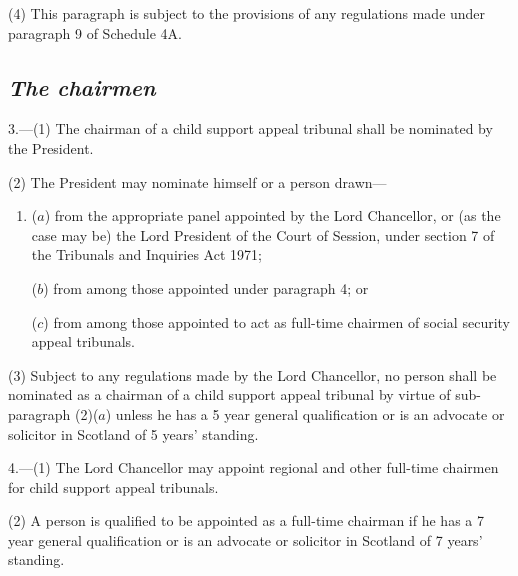 \documentclass[12pt,a4paper]{article}
\begin{document}
(4) This paragraph is subject to the provisions of any regulations made under paragraph 9 of Schedule 4A.


\subsection*{\itshape The chairmen}

3.---(1) The chairman of a child support appeal tribunal shall be nominated by the President.

(2) The President may nominate himself or a person drawn—
\begin{enumerate}\item[]
($a$) from the appropriate panel appointed by the Lord Chancellor, or (as the case may be) the Lord President of the Court of Session, under section 7 of the Tribunals and Inquiries Act 1971;

($b$) from among those appointed under paragraph 4; or

($c$) from among those appointed 
to act as full-time chairmen of social security appeal tribunals.
\end{enumerate}

(3) Subject to any regulations made by the Lord Chancellor, no person shall be nominated as a chairman of a child support appeal tribunal by virtue of sub-paragraph (2)($a$)  unless he has a 5 year general qualification or is an advocate or solicitor in Scotland of 5 years' standing.


\medskip

4.---(1) The Lord Chancellor may appoint regional and other full-time chairmen for child support appeal tribunals.

(2) A person is qualified to be appointed as a full-time chairman if he has a 7 year general qualification or is an advocate or solicitor in Scotland of 7 years' standing.
\end{document}
